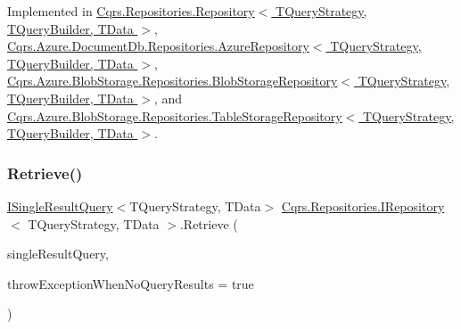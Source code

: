 Implemented in \hyperlink{classCqrs_1_1Repositories_1_1Repository_a444e9dfe4710be90940dbb6dec9d856f_a444e9dfe4710be90940dbb6dec9d856f}{Cqrs.\+Repositories.\+Repository$<$ T\+Query\+Strategy, T\+Query\+Builder, T\+Data $>$}, \hyperlink{classCqrs_1_1Azure_1_1DocumentDb_1_1Repositories_1_1AzureRepository_a22c58163e101a6cb80f891bed6114380_a22c58163e101a6cb80f891bed6114380}{Cqrs.\+Azure.\+Document\+Db.\+Repositories.\+Azure\+Repository$<$ T\+Query\+Strategy, T\+Query\+Builder, T\+Data $>$}, \hyperlink{classCqrs_1_1Azure_1_1BlobStorage_1_1Repositories_1_1BlobStorageRepository_a7c5a3ca4d92cf4954508fb3e583eb49e_a7c5a3ca4d92cf4954508fb3e583eb49e}{Cqrs.\+Azure.\+Blob\+Storage.\+Repositories.\+Blob\+Storage\+Repository$<$ T\+Query\+Strategy, T\+Query\+Builder, T\+Data $>$}, and \hyperlink{classCqrs_1_1Azure_1_1BlobStorage_1_1Repositories_1_1TableStorageRepository_a7238452f19c9d51b5733df7701920605_a7238452f19c9d51b5733df7701920605}{Cqrs.\+Azure.\+Blob\+Storage.\+Repositories.\+Table\+Storage\+Repository$<$ T\+Query\+Strategy, T\+Query\+Builder, T\+Data $>$}.

\mbox{\label{interfaceCqrs_1_1Repositories_1_1IRepository_a65848508067b81e82da72af2063f2c07_a65848508067b81e82da72af2063f2c07}} 
\subsubsection{\texorpdfstring{Retrieve()}{Retrieve()}\hspace{0.1cm}{\footnotesize\ttfamily [1/2]}}
{\footnotesize\ttfamily \hyperlink{interfaceCqrs_1_1Repositories_1_1Queries_1_1ISingleResultQuery}{I\+Single\+Result\+Query}$<$T\+Query\+Strategy, T\+Data$>$ \hyperlink{interfaceCqrs_1_1Repositories_1_1IRepository}{Cqrs.\+Repositories.\+I\+Repository}$<$ T\+Query\+Strategy, T\+Data $>$.Retrieve (\begin{DoxyParamCaption}\item[{\hyperlink{interfaceCqrs_1_1Repositories_1_1Queries_1_1ISingleResultQuery}{I\+Single\+Result\+Query}$<$ T\+Query\+Strategy, T\+Data $>$}]{single\+Result\+Query,  }\item[{bool}]{throw\+Exception\+When\+No\+Query\+Results = {\ttfamily true} }\end{DoxyParamCaption})}



